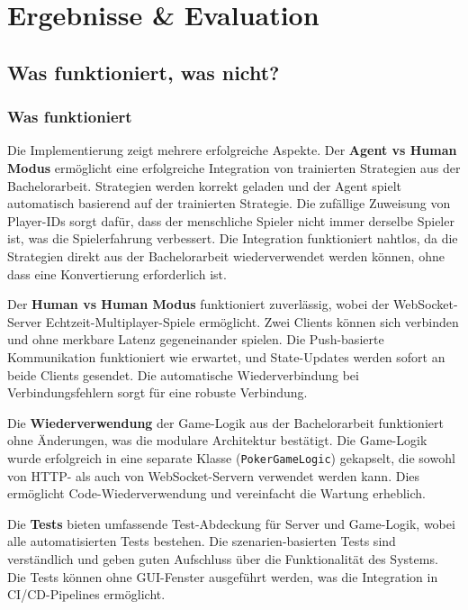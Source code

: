 \section{Ergebnisse \& Evaluation}\label{sec:ergebnisse}

\subsection{Was funktioniert, was nicht?}

\subsubsection{Was funktioniert}

Die Implementierung zeigt mehrere erfolgreiche Aspekte.
Der \textbf{Agent vs Human Modus} ermöglicht eine erfolgreiche Integration von trainierten Strategien aus der Bachelorarbeit.
Strategien werden korrekt geladen und der Agent spielt automatisch basierend auf der trainierten Strategie.
Die zufällige Zuweisung von Player-IDs sorgt dafür, dass der menschliche Spieler nicht immer derselbe Spieler ist, was die Spielerfahrung verbessert.
Die Integration funktioniert nahtlos, da die Strategien direkt aus der Bachelorarbeit wiederverwendet werden können, ohne dass eine Konvertierung erforderlich ist.

Der \textbf{Human vs Human Modus} funktioniert zuverlässig, wobei der WebSocket-Server Echtzeit-Multiplayer-Spiele ermöglicht.
Zwei Clients können sich verbinden und ohne merkbare Latenz gegeneinander spielen.
Die Push-basierte Kommunikation funktioniert wie erwartet, und State-Updates werden sofort an beide Clients gesendet.
Die automatische Wiederverbindung bei Verbindungsfehlern sorgt für eine robuste Verbindung.

Die \textbf{Wiederverwendung} der Game-Logik aus der Bachelorarbeit funktioniert ohne Änderungen, was die modulare Architektur bestätigt.
Die Game-Logik wurde erfolgreich in eine separate Klasse (\texttt{PokerGameLogic}) gekapselt, die sowohl von HTTP- als auch von WebSocket-Servern verwendet werden kann.
Dies ermöglicht Code-Wiederverwendung und vereinfacht die Wartung erheblich.

Die \textbf{Tests} bieten umfassende Test-Abdeckung für Server und Game-Logik, wobei alle automatisierten Tests bestehen.
Die szenarien-basierten Tests sind verständlich und geben guten Aufschluss über die Funktionalität des Systems.
Die Tests können ohne GUI-Fenster ausgeführt werden, was die Integration in CI/CD-Pipelines ermöglicht.

